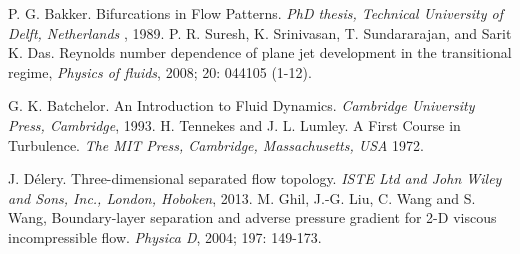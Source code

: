\begin{thebibliography}{160}
 P. G. Bakker. Bifurcations in Flow Patterns. {\em PhD thesis, Technical University of Delft, Netherlands }, 1989.
 P. R. Suresh, K. Srinivasan, T. Sundararajan, and Sarit K. Das. {Reynolds number dependence of plane jet development in the transitional regime}, {\em Physics of fluids}, 2008; 20: 044105 (1-12).

 G. K. Batchelor. An Introduction to Fluid Dynamics. {\em Cambridge University Press, Cambridge}, 1993.
 H. Tennekes  and J. L. Lumley.  {A First Course in Turbulence.} {\em The MIT Press, Cambridge,  Massachusetts, USA} 1972.

 J. D\'{e}lery. Three-dimensional separated flow topology. {\em ISTE Ltd and John Wiley and Sons, Inc., London, Hoboken}, 2013.
 M. Ghil, J.-G. Liu, C. Wang and S. Wang, Boundary-layer separation and adverse pressure gradient for 2-D viscous incompressible flow. {\em Physica D}, 2004; 197: 149-173.


\end{thebibliography}
